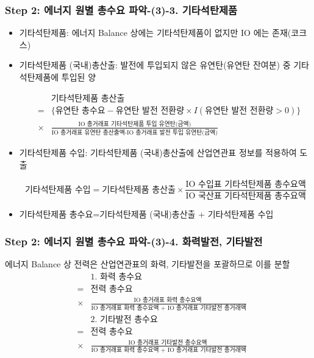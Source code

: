\documentclass[10pt,compress,slidetop,%
			   hyperref={unicode},xcolor={svgnames},%
			   t]{beamer}
\begin{document}
\begin{frame}
	\frametitle{Step 2: 에너지 원별 총수요 파악-(3)-3. 기타석탄제품}
\bigskip
		\begin{itemize}
	\item{기타석탄제품: 에너지 Balance 상에는 기타석탄제품이 없지만 IO 에는 존재(코크스)}
	\item{기타석탄제품 (국내)총산출: 발전에 투입되지 않은 유연탄(유연탄 잔여분) 중 기타석탄제품에 투입된 양 }	
\begin{small}
			\begin{eqnarray*}
			& &\mbox{기타석탄제품 총산출}\\ 
			&=&\{\mbox{유연탄 총수요} -\mbox{유연탄 발전 전환량}\times I(\mbox{유연탄 발전 전환량$>$0})\}\\
			&\times&\frac{\mbox{IO 총거래표 기타석탄제품 투입 유연탄(금액)}}{\mbox{IO 총거래표 유연탄 총산출액-IO 총거래표 발전 투입 유연탄(금액)}} 
			\end{eqnarray*}
\end{small}
	\item{기타석탄제품 수입: 기타석탄제품 (국내)총산출에 산업연관표 정보를 적용하여 도출 }
\begin{small}
			\begin{displaymath}
			\mbox{기타석탄제품 수입} =\mbox{기타석탄제품 총산출}\times\frac{\mbox{IO 수입표 기타석탄제품 총수요액}}{\mbox{IO 국산표 기타석탄제품 총수요액}} 
			\end{displaymath}		
\end{small}
		\item{기타석탄제품 총수요=기타석탄제품 (국내)총산출 + 기타석탄제품 수입}
				\end{itemize} 	
	
	
\end{frame}

\begin{frame}
	\frametitle{Step 2: 에너지 원별 총수요 파악-(3)-4. 화력발전, 기타발전}

에너지 Balance 상 전력은 산업연관표의 화력, 기타발전을 포괄하므로 이를 분할
\begin{eqnarray*}
			& &\mbox{1. 화력 총수요}\\ 
			&=&\mbox{전력 총수요}\\
			&\times&\frac{\mbox{IO 총거래표 화력 총수요액 }}{\mbox{IO 총거래표 화력 총수요액 + IO 총거래표 기타발전 총거래액}} 
			\end{eqnarray*}
			\begin{eqnarray*}
			& &\mbox{2. 기타발전 총수요}\\ 
			&=&\mbox{전력 총수요}\\
			&\times&\frac{\mbox{IO 총거래표 기타발전 총수요액 }}{\mbox{IO 총거래표 화력 총수요액 + IO 총거래표 기타발전 총거래액}} 
			\end{eqnarray*}
	
\end{frame}
\end{document}
